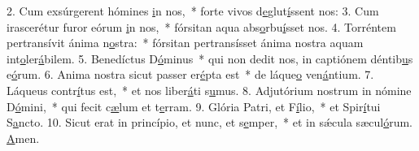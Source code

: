 2. Cum exsúrgerent hómines \uline{i}n nos,~* forte vivos d\uline{e}glut\uline{í}ssent nos:
3. Cum irascerétur furor eórum \uline{i}n nos,~* fórsitan aqua abs\uline{o}rbu\uline{í}sset nos.
4. Torréntem pertransívit ánima n\uline{o}stra:~* fórsitan pertransísset ánima nostra aquam int\uline{o}ler\uline{á}bilem.
5. Benedíctus D\uline{ó}minus~* qui non dedit nos, in captiónem déntib\uline{u}s e\uline{ó}rum.
6. Anima nostra sicut passer er\uline{é}pta est~* de láque\uline{o} ven\uline{á}ntium.
7. Láqueus contr\uline{í}tus est,~* et nos liber\uline{á}ti s\uline{u}mus.
8. Adjutórium nostrum in nómine D\uline{ó}mini,~* qui fecit c\uline{æ}lum et t\uline{e}rram.
9. Glória Patri, et F\uline{í}lio,~* et Spir\uline{í}tui S\uline{a}ncto.
10. Sicut erat in princípio, et nunc, et s\uline{e}mper,~* et in sǽcula sæcul\uline{ó}rum. \uline{A}men.
